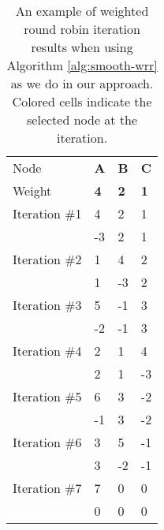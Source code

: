 \begin{table}[]
\centering
\begin{tabular}{llll}
Node          & \textbf{A}                & \textbf{B}                & \textbf{C}                \\
Weight        & \textbf{4}                & \textbf{2}                & \textbf{1}                \\ \hline
Iteration \#1 & \cellcolor[HTML]{FFCE93}4 & 2                         & 1                         \\
              & -3                        & 2                         & 1                         \\ \hline
Iteration \#2 & 1                         & \cellcolor[HTML]{FFCE93}4 & 2                         \\
              & 1                         & -3                        & 2                         \\ \hline
Iteration \#3 & \cellcolor[HTML]{FFCE93}5 & -1                        & 3                         \\
              & -2                        & -1                        & 3                         \\ \hline
Iteration \#4 & 2                         & 1                         & \cellcolor[HTML]{FFCE93}4 \\
              & 2                         & 1                         & -3                        \\ \hline
Iteration \#5 & \cellcolor[HTML]{FFCE93}6 & 3                         & -2                        \\
              & -1                        & 3                         & -2                        \\ \hline
Iteration \#6 & 3                         & \cellcolor[HTML]{FFCE93}5 & -1                        \\
              & 3                         & -2                        & -1                        \\ \hline
Iteration \#7 & \cellcolor[HTML]{FFCE93}7 & 0                         & 0                         \\
              & 0                         & 0                         & 0                        
\end{tabular}
\caption{An example of weighted round robin iteration results when using Algorithm \ref{alg:smooth-wrr} as we do in our approach. Colored cells indicate the selected node at the iteration.}
\label{tab:smooth-wrr-demo}
\end{table}
